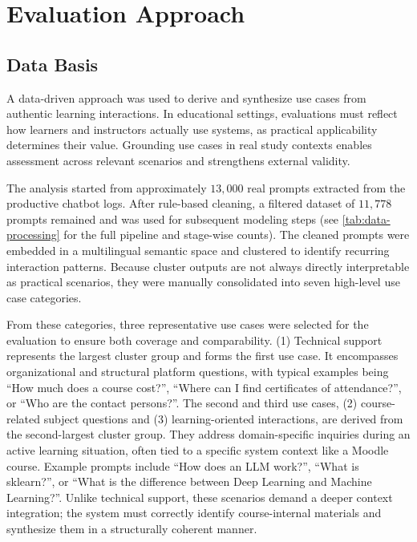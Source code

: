 \section{Evaluation Approach}

\subsection{Data Basis}
\label{data_basis}
A data-driven approach was used to derive and synthesize use cases from authentic learning interactions. In educational settings, evaluations must reflect how learners and instructors actually use systems, as practical applicability determines their value. Grounding use cases in real study contexts enables assessment across relevant scenarios and strengthens external validity.

The analysis started from approximately $13,000$ real prompts extracted from the productive chatbot logs. After rule-based cleaning, a filtered dataset of $11,778$ prompts remained and was used for subsequent modeling steps (see \autoref{tab:data-processing} for the full pipeline and stage-wise counts).
The cleaned prompts were embedded in a multilingual semantic space and clustered to identify recurring interaction patterns. Because cluster outputs are not always directly interpretable as practical scenarios, they were manually consolidated into seven high-level use case categories.

From these categories, three representative use cases were selected for the evaluation to ensure both coverage and comparability. (1) Technical support represents the largest cluster group and forms the first use case. It encompasses organizational and structural platform questions, with typical examples being \enquote{How much does a course cost?}, \enquote{Where can I find certificates of attendance?}, or \enquote{Who are the contact persons?}. The second and third use cases, (2) course-related subject questions and (3) learning-oriented interactions, are derived from the second-largest cluster group. They address domain-specific inquiries during an active learning situation, often tied to a specific system context like a Moodle course. Example prompts include \enquote{How does an LLM work?}, \enquote{What is sklearn?}, or \enquote{What is the difference between Deep Learning and Machine Learning?}. Unlike technical support, these scenarios demand a deeper context integration; the system must correctly identify course-internal materials and synthesize them in a structurally coherent manner. 

